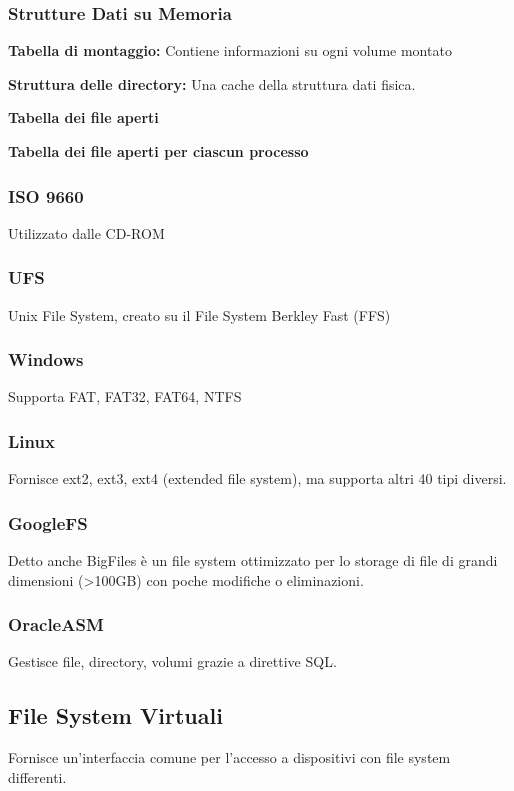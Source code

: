 \subsubsection*{Strutture Dati su Memoria}
\begin{sitemize}
    \item \textbf{Tabella di montaggio:} Contiene informazioni su ogni volume montato
    \item \textbf{Struttura delle directory:} Una cache della struttura dati fisica.
    \item \textbf{Tabella dei file aperti}
    \item \textbf{Tabella dei file aperti per ciascun processo}
\end{sitemize}

\subsubsection*{ISO 9660}
Utilizzato dalle CD-ROM

\subsubsection*{UFS}
Unix File System, creato su il File System Berkley Fast (FFS)

\subsubsection*{Windows}
Supporta FAT, FAT32, FAT64, NTFS

\subsubsection*{Linux}
Fornisce ext2, ext3, ext4 (extended file system), ma supporta altri 40 tipi diversi.

\subsubsection*{GoogleFS}
Detto anche BigFiles è un file system ottimizzato per lo storage di file di grandi dimensioni (>100GB) con poche modifiche o eliminazioni.

\subsubsection*{OracleASM}
Gestisce file, directory, volumi grazie a direttive SQL.

\subsection{File System Virtuali}
Fornisce un'interfaccia comune per l'accesso a dispositivi con file system differenti.


